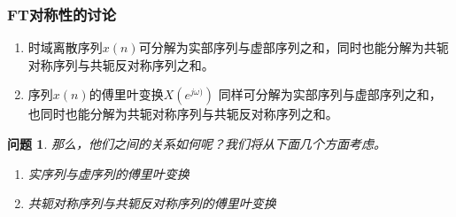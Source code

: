 \documentclass[notheorems,compress,mathserif,table]{beamer}
\newtheorem{wenti}{问题}
\begin{document}
\begin{frame}[shrink]\frametitle{FT对称性的讨论}%
\begin{enumerate}

\item [(1)] 时域离散序列$x(n)$可分解为实部序列与虚部序列之和，同时也能分解为共轭对称序列与共轭反对称序列之和。
\item [(2)] 序列$x(n)$的傅里叶变换$X(e^{j\omega)})$ 同样可分解为实部序列与虚部序列之和，也同时也能分解为共轭对称序列与共轭反对称序列之和。
\end{enumerate}

\begin{wenti}
那么，他们之间的关系如何呢？我们将从下面几个方面考虑。

\begin{enumerate}
\item  实序列与虚序列的傅里叶变换
\item 共轭对称序列与共轭反对称序列的傅里叶变换
\end{enumerate}
\end{wenti}
\end{frame}
\end{document}
